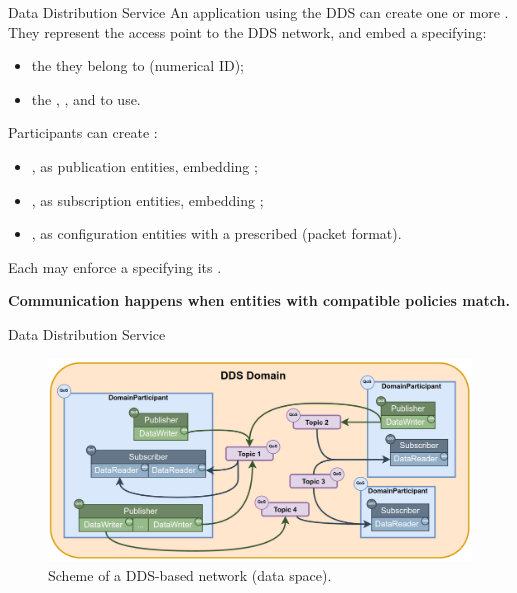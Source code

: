 \begin{frame}{Data Distribution Service}
	An application using the DDS can create one or more .\\
	They represent the access point to the DDS network, and embed a  specifying:
	\begin{itemize}
		\item the  they belong to (numerical ID);
		\item the , , and  to use.
	\end{itemize}
	\bigskip
	Participants can create :
	\begin{itemize}
		\item {}, as publication entities, embedding ;
		\item {}, as subscription entities, embedding ;
		\item {}, as configuration entities with a prescribed  (packet format).
	\end{itemize}
	Each may enforce a  specifying its .
	\begin{block}{}
		\centering
		\textbf{Communication happens when entities with compatible policies match.}
	\end{block}
\end{frame}
\begin{frame}{Data Distribution Service}
	\begin{figure}
		\centering
		\includegraphics[width=.85\textwidth]{dds_domain}
		\caption{Scheme of a DDS-based network (data space).}
		\label{fig:ddsdomain}
	\end{figure}
\end{frame}
